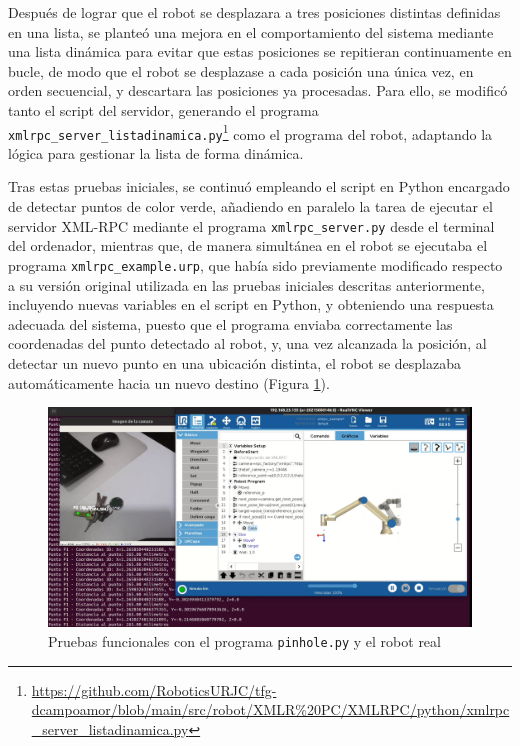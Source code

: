 Después de lograr que el robot se desplazara a tres posiciones distintas definidas en una lista, se planteó una mejora en el comportamiento del sistema mediante una lista dinámica para evitar que estas posiciones se repitieran continuamente en bucle, de modo que el robot se desplazase a cada posición una única vez, en orden secuencial, y descartara las posiciones ya procesadas. Para ello, se modificó tanto el script del servidor, generando el programa \verb|xmlrpc_server_listadinamica.py|\footnote{\url{https://github.com/RoboticsURJC/tfg-dcampoamor/blob/main/src/robot/XMLR\%20PC/XMLRPC/python/xmlrpc_server_listadinamica.py}} como el programa del robot, adaptando la lógica para gestionar la lista de forma dinámica.

Tras estas pruebas iniciales, se continuó empleando el script en Python encargado de detectar puntos de color verde, añadiendo en paralelo la tarea de ejecutar el servidor XML-RPC mediante el programa \verb|xmlrpc_server.py| desde el terminal del ordenador, mientras que, de manera simultánea en el robot se ejecutaba el programa \verb|xmlrpc_example.urp|, que había sido previamente modificado respecto a su versión original utilizada en las pruebas iniciales descritas anteriormente, incluyendo nuevas variables en el script en Python, y obteniendo una respuesta adecuada del sistema, puesto que el programa enviaba correctamente las coordenadas del punto detectado al robot, y, una vez alcanzada la posición, al detectar un nuevo punto en una ubicación distinta, el robot se desplazaba automáticamente hacia un nuevo destino (Figura \ref{fig:pinhole_UR}). 

    \begin{figure}[H]
     \centering
     \begin{center}
       \includegraphics[width=155mm]{figs/Programa robot posetrans UR10e.png}
     \end{center}
     \caption{Pruebas funcionales con el programa \texttt{pinhole.py} y el robot real}
     \label{fig:pinhole_UR}
  \end{figure}


